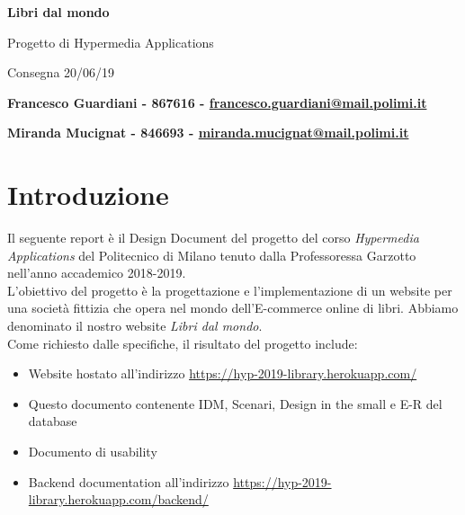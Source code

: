 \documentclass[12pt,a4paper,oneside]{report}
\begin{document}
\begin{titlepage}
   \begin{center}
       \vspace*{1cm}
 
       {\huge \textbf{Libri dal mondo}}
 
       \vspace{0.5cm}
        {\Large Progetto di Hypermedia Applications}
        
       \vspace{0.5cm}
        Consegna 20/06/19
 
       \vspace{1cm}
 
       \textbf{Francesco Guardiani - 867616 -  \href{mailto:francesco.guardiani@mail.polimi.it}{francesco.guardiani@mail.polimi.it}}
       
      \textbf{Miranda Mucignat - 846693 -  \href{mailto:miranda.mucignat@mail.polimi.it}{miranda.mucignat@mail.polimi.it}}
 
   \end{center}
\end{titlepage}

\tableofcontents
\newpage

\chapter{Introduzione}

Il seguente report è il Design Document del progetto del corso \textit{Hypermedia Applications} del Politecnico di Milano tenuto dalla Professoressa Garzotto nell’anno accademico 2018-2019.\\
L’obiettivo del progetto è la progettazione e l'implementazione di un website per una società fittizia che opera nel mondo dell'E-commerce online di libri. Abbiamo denominato il nostro website \textit{Libri dal mondo}.\\
Come richiesto dalle specifiche, il risultato del progetto include:

\begin{itemize}
	\item Website hostato all'indirizzo \href{https://hyp-2019-library.herokuapp.com/}{https://hyp-2019-library.herokuapp.com/}
	\item Questo documento contenente IDM, Scenari, Design in the small e E-R del database
	\item Documento di usability
	\item Backend documentation all'indirizzo \href{https://hyp-2019-library.herokuapp.com/backend/}{https://hyp-2019-library.herokuapp.com/backend/}
\end{itemize}
\end{document}
